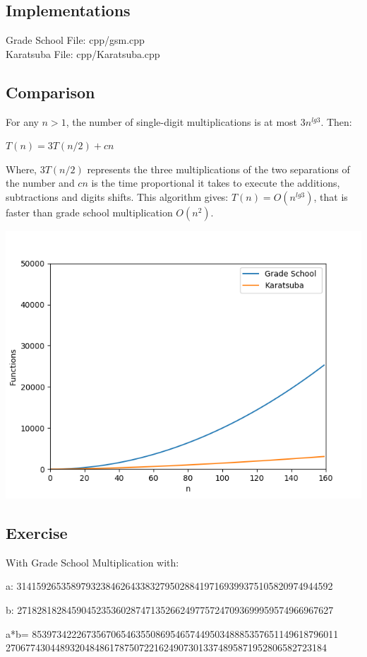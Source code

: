 \documentclass[12pt]{article}
\begin{document}
\subsection*{Implementations}
Grade School File: cpp/gsm.cpp\\
Karatsuba File: cpp/Karatsuba.cpp

\subsection*{Comparison}
For any $n>1$, the number of single-digit multiplications is at most $3n^{lg3}$. Then:
\begin{center}
    $T(n)=3T(n/2)+cn$
\end{center}
Where, $3T(n/2)$ represents the three multiplications of the two separations of the number and $cn$ is the time proportional it takes to execute the additions, subtractions and digits shifts.
This algorithm gives: $T(n)=O(n^{lg3})$, that is faster than grade school multiplication $O(n^2)$.

\begin{center}
\includegraphics[]{img/Figure_2.png}

\end{center}

\subsection*{Exercise}

With Grade School Multiplication with:
\begin{description}
    \item{a:} 3141592653589793238462643383279502884197169399375105820974944592
    \item{b:} 2718281828459045235360287471352662497757247093699959574966967627
    \item{a*b=} 85397342226735670654635508695465744950348885357651149618796011\\
    27067743044893204848617875072216249073013374895871952806582723184
    \end{description}
\end{document}
